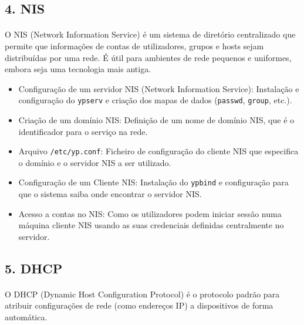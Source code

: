 \documentclass[10pt,a4paper]{article}
\begin{document}
		\subsection*{4. NIS}
		\vspace{-1.2em}
		\paragraph{}
		O NIS (Network Information Service) é um sistema de diretório centralizado que permite que informações de contas de utilizadores, grupos e hosts sejam distribuídas por uma rede. É útil para ambientes de rede pequenos e uniformes, embora seja uma tecnologia mais antiga.
		
		\begin{itemize}
			\item Configuração de um servidor NIS (Network Information Service): Instalação e configuração do \texttt{ypserv} e criação dos mapas de dados (\texttt{passwd}, \texttt{group}, etc.).
			\item Criação de um domínio NIS: Definição de um nome de domínio NIS, que é o identificador para o serviço na rede.
			\item Arquivo \texttt{/etc/yp.conf}: Ficheiro de configuração do cliente NIS que especifica o domínio e o servidor NIS a ser utilizado.
			\item Configuração de um Cliente NIS: Instalação do \texttt{ypbind} e configuração para que o sistema saiba onde encontrar o servidor NIS.
			\item Acesso a contas no NIS: Como os utilizadores podem iniciar sessão numa máquina cliente NIS usando as suas credenciais definidas centralmente no servidor.
		\end{itemize}
		
		\subsection*{5. DHCP}
		\vspace{-1.2em}
		\paragraph{}
		O DHCP (Dynamic Host Configuration Protocol) é o protocolo padrão para atribuir configurações de rede (como endereços IP) a dispositivos de forma automática.
		
\end{document}
